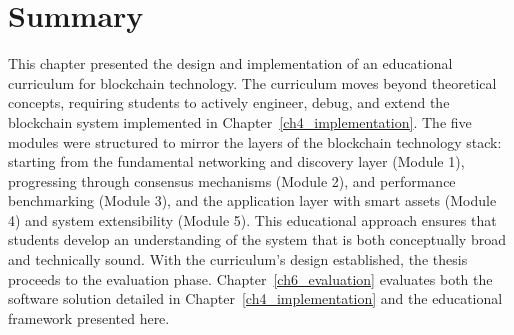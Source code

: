 \newpage
\section{Summary} \label{ch5_summary}

This chapter presented the design and implementation of an educational curriculum for blockchain technology. The curriculum moves beyond theoretical concepts, requiring students to actively engineer, debug, and extend the blockchain system implemented in Chapter~\ref{ch4_implementation}.
The five modules were structured to mirror the layers of the blockchain technology stack: starting from the fundamental networking and discovery layer  (Module 1), progressing through consensus mechanisms (Module 2), and performance benchmarking (Module 3), and the application layer with smart assets (Module 4) and system extensibility (Module 5). This educational approach ensures that students develop an understanding of the system that is both conceptually broad and technically sound. With the curriculum's design established, the thesis proceeds to the evaluation phase. Chapter~\ref{ch6_evaluation} evaluates both the software solution detailed in Chapter~\ref{ch4_implementation} and the educational framework presented here.